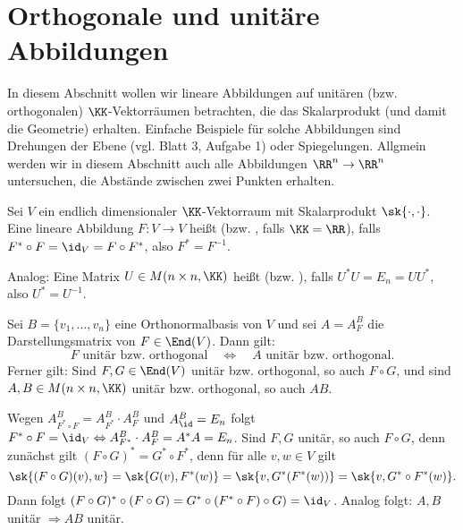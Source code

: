 \section{Orthogonale und unitäre Abbildungen}
\label{sec:2.6}

In diesem Abschnitt wollen wir lineare Abbildungen auf unitären (bzw. orthogonalen) $\KK$-Vektorräumen betrachten, die das Skalarprodukt (und damit die Geometrie) erhalten.
Einfache Beispiele für solche Abbildungen sind Drehungen der Ebene (vgl. Blatt 3, Aufgabe 1) oder Spiegelungen.
Allgmein werden wir in diesem Abschnitt auch alle Abbildungen $\RR^n \rightarrow \RR^n$ untersuchen, die Abstände zwischen zwei Punkten erhalten.

\begin{definition}
	\label{def:6.1}
	Sei $V$ ein endlich dimensionaler $\KK$-Vektorraum mit Skalarprodukt $\sk{\cdot,\cdot}$.
	Eine lineare Abbildung $F \colon V \rightarrow V$ heißt  (bzw. , falls $\KK= \RR$), falls $F^* \circ F = \id_V = F \circ F^*$, also $F^* = F^{-1}$.
	
	Analog: Eine Matrix $U \in M(n \times n,\KK)$ heißt  (bzw. ), falls $U^*U = E_n = UU^*$, also $U^* = U^{-1}$.
\end{definition}

\begin{lemma}
	\label{lemma:6.2}
	Sei $B = \{v_1,\dots,v_n\}$ eine Orthonormalbasis von $V$ und sei $A = A^B_F$ die Darstellungsmatrix von $F \in \End(V)$.
	Dann gilt: 
	\[
		F \text{ unitär bzw. orthogonal} \quad \Leftrightarrow \quad A \text{ unitär bzw. orthogonal}.
	\]
	Ferner gilt:
	Sind $F,G \in \End(V)$ unitär bzw. orthogonal, so auch $F \circ G$, und sind $A,B \in M(n \times n, \KK)$ unitär bzw. orthogonal, so auch $AB$.
\end{lemma}

\begin{beweis}
	Wegen $A_{F^* \circ F}^B = A_{F^*}^B \cdot A_F^B$ und $A_{\id}^B = E_n$ folgt $F^* \circ F = \id_V \Leftrightarrow A_{F^*}^B \cdot A_F^B = A^*A = E_n$.
	Sind $F,G$ unitär, so auch $F \circ G$, denn zunächst gilt $(F \circ G)^* = G^* \circ F^*$, denn für alle $v,w \in V$ gilt
	\[
		\sk{(F \circ G)(v),w} = \sk{G(v),F^*(w)} = \sk{v,G^*(F^*(w))} = \sk{v,G^*\circ F^*(w)}.
	\]
	Dann folgt $(F \circ G)^* \circ (F \circ G) = G^* \circ (F^* \circ F) \circ G ) = \id_V$.
	Analog folgt: $A,B$ unitär $\Rightarrow AB$ unitär. 
\end{beweis}

